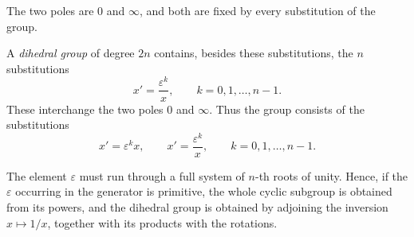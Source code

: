 \documentclass[11pt]{article}
\begin{document}
The two poles are \(0\) and \(\infty\), and both are fixed by every substitution of the group.

A \emph{dihedral group} of degree \(2n\) contains, besides these substitutions, the \(n\) substitutions
\begin{equation}
x'=\frac{\varepsilon^k}{x},
\qquad k=0,1,\ldots,n-1.
\end{equation}
These interchange the two poles \(0\) and \(\infty\).  Thus the group consists of the substitutions
\begin{equation}
x'=\varepsilon^k x,\qquad
x'=\frac{\varepsilon^k}{x},
\qquad k=0,1,\ldots,n-1.
\end{equation}

The element \(\varepsilon\) must run through a full system of \(n\)-th roots of unity.  Hence, if the \(\varepsilon\) occurring in the generator is primitive, the whole cyclic subgroup is obtained from its powers, and the dihedral group is obtained by adjoining the inversion \(x\mapsto 1/x\), together with its products with the rotations.
\end{document}
